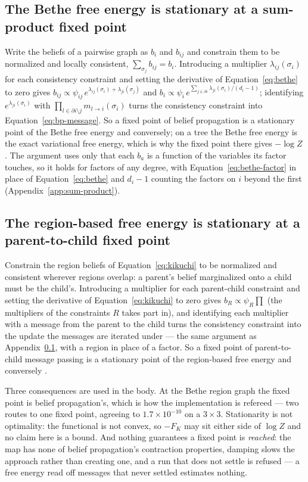 \documentclass[11pt,a4paper]{article}
\begin{document}
\subsection{The Bethe free energy is stationary at a sum-product fixed point}
\label{app:bethe}
Write the beliefs of a pairwise graph as $b_i$ and $b_{ij}$ and constrain them
to be normalized and locally consistent, $\sum_{\sigma_j} b_{ij} = b_i$.
Introducing a multiplier $\lambda_{ij}(\sigma_i)$ for each consistency
constraint and setting the derivative of Equation~\ref{eq:bethe} to zero gives
$b_{ij} \propto \psi_{ij}\, e^{\lambda_{ij}(\sigma_i) + \lambda_{ji}(\sigma_j)}$
and $b_i \propto \psi_i\, e^{\sum_{j \in \partial i} \lambda_{ji}(\sigma_i) / (d_i - 1)}$;
identifying $e^{\lambda_{ji}(\sigma_i)}$ with $\prod_{l \in \partial i
\setminus j} m_{l \to i}(\sigma_i)$ turns the consistency constraint into
Equation~\ref{eq:bp-message}. So a fixed point of belief propagation is a
stationary point of the Bethe free energy and conversely; on a tree the Bethe
free energy is the exact variational free energy, which is why the fixed point
there gives $-\log Z$ \citep{yedidia2005}. The argument uses only that
each $b_a$ is a function of the variables its factor touches, so it holds
for factors of any degree, with Equation~\ref{eq:bethe-factor} in place of
Equation~\ref{eq:bethe} and $d_i - 1$ counting the factors on $i$ beyond
the first (Appendix~\ref{app:sum-product}).

\subsection{The region-based free energy is stationary at a parent-to-child
fixed point}
\label{app:gbp}
Constrain the region beliefs of Equation~\ref{eq:kikuchi} to be normalized and
consistent wherever regions overlap: a parent's belief marginalized onto a
child must be the child's. Introducing a multiplier for each parent-child
constraint and setting the derivative of Equation~\ref{eq:kikuchi} to zero
gives $b_R \propto \psi_R \prod$ (the multipliers of the constraints $R$ takes
part in), and identifying each multiplier with a message from the parent to the
child turns the consistency constraint into the update the messages are
iterated under --- the same argument as Appendix~\ref{app:bethe}, with a
region in place of a factor. So a fixed point of parent-to-child message
passing is a stationary point of the region-based free energy and conversely
\citep{yedidia2005}.

Three consequences are used in the body. At the Bethe region graph the fixed
point is belief propagation's, which is how the implementation is refereed ---
two routes to one fixed point, agreeing to $1.7 \times 10^{-10}$ on a
$3 \times 3$. Stationarity is not optimality: the functional is not convex, so
$-F_K$ may sit either side of $\log Z$ and no claim here is a bound. And
nothing guarantees a fixed point is \emph{reached}: the map has none of belief
propagation's contraction properties, damping slows the approach rather than
creating one, and a run that does not settle is refused --- a free energy read
off messages that never settled estimates nothing.
\end{document}
